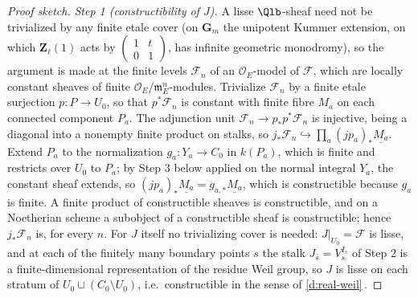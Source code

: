 \documentclass[11pt]{article}
\theoremstyle{plain}
\theoremstyle{definition}
\newcommand{\Cref}[1]{\hyperref[#1]{\ref{#1}}\,\hyperref[#1]{\nameref*{#1}}}
\begin{document}
\begin{proof}[Proof sketch]
\emph{Step 1 (constructibility of $J$).}  A lisse $\Qlb$-sheaf need not
be trivialized by any finite etale cover (on $\mathbf G_m$ the unipotent
Kummer extension, on which $\mathbf Z_\ell(1)$ acts by
$\left(\begin{smallmatrix}1&t\\0&1\end{smallmatrix}\right)$, has infinite
geometric monodromy), so the argument is made at the finite levels
$\mathcal F_n$ of an $\mathcal O_E$-model of $\mathcal F$, which are
locally constant sheaves of finite $\mathcal O_E/\mathfrak m_E^n$-modules.
Trivialize $\mathcal F_n$ by a
finite etale surjection $p:P\to U_0$, so that $p^*\mathcal F_n$ is constant
with finite fibre $M_a$ on each connected component $P_a$.  The
adjunction unit $\mathcal F_n\to p_*p^*\mathcal F_n$ is injective, being a
diagonal into a nonempty finite product on stalks, so
$j_*\mathcal F_n\hookrightarrow\prod_a(jp_a)_*\underline{M_a}$.  Extend $P_a$ to the
normalization $g_a:Y_a\to C_0$ in $k(P_a)$, which is finite and restricts
over $U_0$ to $P_a$;  by Step 3 below applied on the normal integral
$Y_a$, the constant sheaf extends, so
$(jp_a)_*\underline{M_a}=g_{a,*}\underline{M_a}$, which is constructible
because $g_a$ is finite.  A finite product of constructible sheaves is
constructible, and on a Noetherian scheme a subobject of a constructible
sheaf is constructible;  hence $j_*\mathcal F_n$ is, for every $n$.  For
$J$ itself no trivializing cover is needed:  $J|_{U_0}=\mathcal F$ is
lisse, and at each of the finitely many boundary points $s$ the stalk
$J_{\bar s}=V_s^{I_s}$ of Step 2 is a finite-dimensional representation of
the residue Weil group, so $J$ is lisse on each stratum of
$U_0\sqcup(C_0\setminus U_0)$, i.e.\ constructible in the sense of
\Cref{d:real-weil}.


\end{proof}
\end{document}
